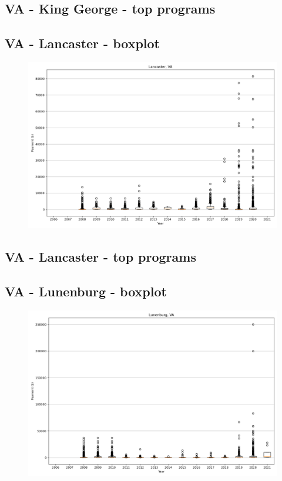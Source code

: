 \subsection*{VA - King George - top programs}

\newpage
\subsection*{VA - Lancaster - boxplot}
\begin{figure}[h]
\centering
\includegraphics[width=7in]{../output/boxplots/counties/Lancaster-VA_boxplot.png}
\end{figure}


\subsection*{VA - Lancaster - top programs}

\newpage
\subsection*{VA - Lunenburg - boxplot}
\begin{figure}[h]
\centering
\includegraphics[width=7in]{../output/boxplots/counties/Lunenburg-VA_boxplot.png}
\end{figure}


